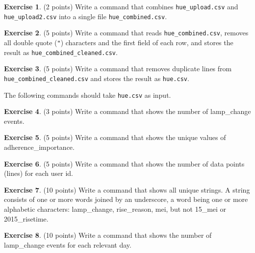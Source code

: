 \documentclass[a4paper]{report}
\theoremstyle{definition}
\newtheorem{exercise}{Exercise}
\newcommand{\doublequote}{\texttt{"}}
\begin{document}
	\begin{exercise}
		(2 points) Write a command that combines \texttt{hue\_upload.csv} and \texttt{hue\_upload2.csv} into a single file \texttt{hue\_combined.csv}.
	\end{exercise}
	
	\begin{exercise}
		(5 points) Write a command that reads \texttt{hue\_combined.csv}, removes all double quote (\doublequote) characters and the first field of each row, and stores the result as \texttt{hue\_combined\_cleaned.csv}.
	\end{exercise}
	
	\begin{exercise}
		(5 points) Write a command that removes duplicate lines from \texttt{hue\_combined\_cleaned.csv} and stores the result as \texttt{hue.csv}.
	\end{exercise}
	
	\noindent The following commands should take \texttt{hue.csv} as input.
	
	\begin{exercise}
		(3 points) Write a command that shows the number of lamp\_change events.
	\end{exercise}
	
	\begin{exercise}
		(5 points) Write a command that shows the unique values of adherence\_importance.
	\end{exercise}
	
	\begin{exercise}
		(5 points) Write a command that shows the number of data points (lines) for each
		user id.
	\end{exercise}
	
	\begin{exercise}
		(10 points) Write a command that shows all unique strings. A string consists of one or more words joined by an underscore, a word being
		one or more alphabetic characters: lamp\_change, rise\_reason, mei, but not 15\_mei or 2015\_risetime.
	\end{exercise}
	
	\begin{exercise}
		(10 points) Write a command that shows the number of lamp\_change events for each relevant day.
	\end{exercise}
	
	
\end{document}
